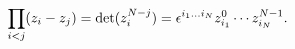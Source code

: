 \begin{equation}
\prod_{i<j} (z_i-z_j) = {\rm det}(z_i^{N-j})=
\epsilon ^{i_1...i_N}z_{i_1}^{0}\cdots z_{i_N}^{N-1}.
\end{equation}

